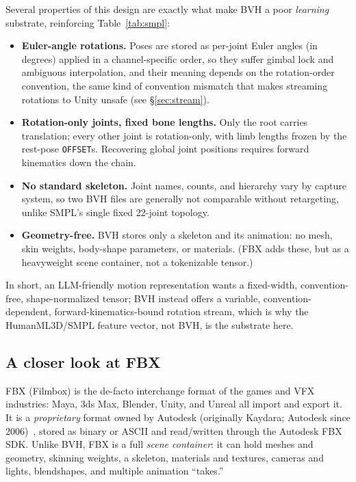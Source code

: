 \documentclass[10pt,twocolumn]{article}
\newcommand{\code}[1]{\texttt{\small #1}}
\begin{document}
Several properties of this design are exactly what make BVH a poor \emph{learning} substrate,
reinforcing Table~\ref{tab:smpl}:
\begin{itemize}
  \item \textbf{Euler-angle rotations.} Poses are stored as per-joint Euler angles (in degrees)
        applied in a channel-specific order, so they suffer gimbal lock and ambiguous
        interpolation, and their meaning depends on the rotation-order convention, the same kind
        of convention mismatch that makes streaming rotations to Unity unsafe (see \S\ref{sec:stream}).
  \item \textbf{Rotation-only joints, fixed bone lengths.} Only the root carries translation; every
        other joint is rotation-only, with limb lengths frozen by the rest-pose \code{OFFSET}s.
        Recovering global joint positions requires forward kinematics down the chain.
  \item \textbf{No standard skeleton.} Joint names, counts, and hierarchy vary by capture system,
        so two BVH files are generally not comparable without retargeting, unlike SMPL's single
        fixed 22-joint topology.
  \item \textbf{Geometry-free.} BVH stores only a skeleton and its animation: no mesh, skin
        weights, body-shape parameters, or materials. (FBX adds these, but as a heavyweight scene
        container, not a tokenizable tensor.)
\end{itemize}
In short, an LLM-friendly motion representation wants a fixed-width, convention-free,
shape-normalized tensor; BVH instead offers a variable, convention-dependent,
forward-kinematics-bound rotation stream, which is why the HumanML3D/SMPL feature vector, not
BVH, is the substrate here.

\subsection{A closer look at FBX}
FBX (Filmbox) is the de-facto interchange format of the games and VFX industries: Maya, 3ds Max,
Blender, Unity, and Unreal all import and export it. It is a \emph{proprietary} format owned by
Autodesk (originally Kaydara; Autodesk since 2006)~\cite{fbx}, stored as binary or ASCII and
read/written through the Autodesk FBX SDK. Unlike BVH, FBX is a full \emph{scene container}: it can
hold meshes and geometry, skinning weights, a skeleton, materials and textures, cameras and lights,
blendshapes, and multiple animation ``takes.''
\end{document}
